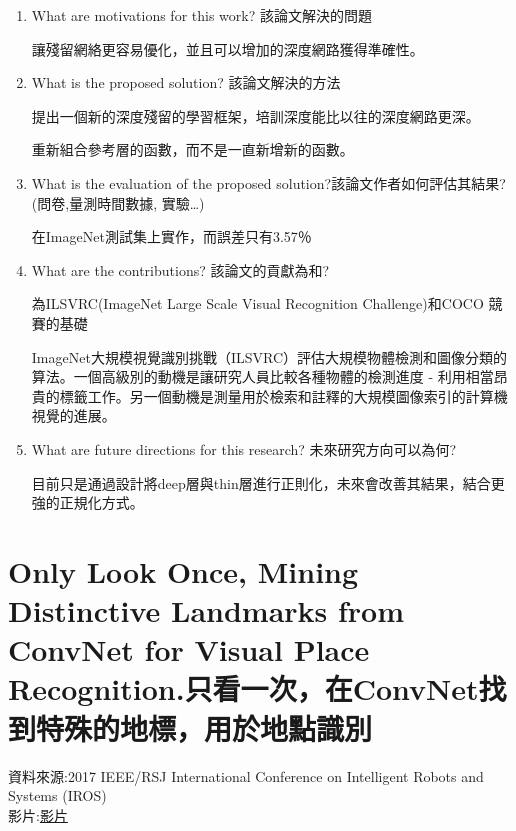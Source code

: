 \begin{enumerate}
\item  What are motivations for this work? 該論文解決的問題  

讓殘留網絡更容易優化，並且可以增加的深度網路獲得準確性。


\item  What is the proposed solution? 該論文解決的方法

提出一個新的深度殘留的學習框架，培訓深度能比以往的深度網路更深。

重新組合參考層的函數，而不是一直新增新的函數。


\item  What is the evaluation of the proposed solution?該論文作者如何評估其結果? (問卷,量測時間數據, 實驗…)

在ImageNet測試集上實作，而誤差只有3.57％


\item  What are the contributions? 該論文的貢獻為和?

為ILSVRC(ImageNet Large Scale Visual Recognition Challenge)和COCO 競賽的基礎

ImageNet大規模視覺識別挑戰（ILSVRC）評估大規模物體檢測和圖像分類的算法。一個高級別的動機是讓研究人員比較各種物體的檢測進度 - 利用相當昂貴的標籤工作。另一個動機是測量用於檢索和註釋的大規模圖像索引的計算機視覺的進展。

\item  What are future directions for this research? 未來研究方向可以為何?

目前只是通過設計將deep層與thin層進行正則化，未來會改善其結果，結合更強的正規化方式。

\end{enumerate}


\section{Only Look Once, Mining Distinctive Landmarks from ConvNet for Visual Place Recognition.只看一次，在ConvNet找到特殊的地標，用於地點識別}
資料來源:{2017 IEEE/RSJ International Conference on Intelligent Robots and Systems (IROS)\cite{Chen:etal:IROS2017}}
\\
影片:\href{1331_VI.mp4}{影片}
      
